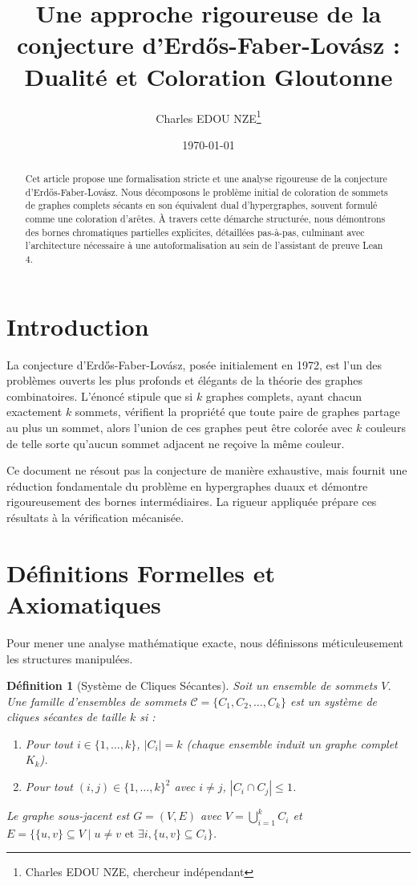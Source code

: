 \documentclass[12pt,a4paper]{article}
\title{\textbf{Une approche rigoureuse de la conjecture d'Erdős-Faber-Lovász : Dualité et Coloration Gloutonne}}
\author{Charles EDOU NZE\thanks{Charles EDOU NZE, chercheur indépendant}}
\date{\today}
\newtheorem{definition}{Définition}
\begin{document}
\maketitle

\begin{abstract}
Cet article propose une formalisation stricte et une analyse rigoureuse de la conjecture d'Erdős-Faber-Lovász. Nous décomposons le problème initial de coloration de sommets de graphes complets sécants en son équivalent dual d'hypergraphes, souvent formulé comme une coloration d'arêtes. À travers cette démarche structurée, nous démontrons des bornes chromatiques partielles explicites, détaillées pas-à-pas, culminant avec l'architecture nécessaire à une autoformalisation au sein de l'assistant de preuve Lean 4.
\end{abstract}

\section{Introduction}
La conjecture d'Erdős-Faber-Lovász, posée initialement en 1972, est l'un des problèmes ouverts les plus profonds et élégants de la théorie des graphes combinatoires.
L'énoncé stipule que si $k$ graphes complets, ayant chacun exactement $k$ sommets, vérifient la propriété que toute paire de graphes partage au plus un sommet, alors l'union de ces graphes peut être colorée avec $k$ couleurs de telle sorte qu'aucun sommet adjacent ne reçoive la même couleur.

Ce document ne résout pas la conjecture de manière exhaustive, mais fournit une réduction fondamentale du problème en hypergraphes duaux et démontre rigoureusement des bornes intermédiaires. La rigueur appliquée prépare ces résultats à la vérification mécanisée.

\section{Définitions Formelles et Axiomatiques}

Pour mener une analyse mathématique exacte, nous définissons méticuleusement les structures manipulées.

\begin{definition}[Système de Cliques Sécantes]
Soit un ensemble de sommets $V$. Une famille d'ensembles de sommets $\mathcal{C} = \{C_1, C_2, \dots, C_k\}$ est un \emph{système de cliques sécantes de taille $k$} si :
\begin{enumerate}
    \item Pour tout $i \in \{1, \dots, k\}$, $|C_i| = k$ (chaque ensemble induit un graphe complet $K_k$).
    \item Pour tout $(i, j) \in \{1, \dots, k\}^2$ avec $i \neq j$, $|C_i \cap C_j| \le 1$.
\end{enumerate}
Le graphe sous-jacent est $G = (V, E)$ avec $V = \bigcup_{i=1}^k C_i$ et $E = \{\{u, v\} \subseteq V \mid u \neq v \text{ et } \exists i, \{u, v\} \subseteq C_i \}$.
\end{definition}
\end{document}
